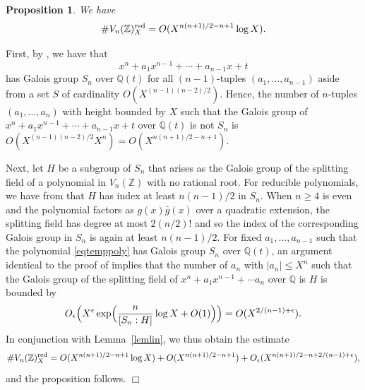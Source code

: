 \documentclass[11pt]{article}
\def\Z{{\mathbb Z}}
\def\red{{\rm red}}
\def\Q{{\mathbb Q}}
\def\V{{\mathcal V}}
\def\Vmn{{V_n}}
\def\Z{{\mathbb Z}}
\def\Q{{\mathbb Q}}
\newtheorem{proposition}[theorem]{Proposition}
\newenvironment{proof}{\noindent {\bf Proof:}}{$\Box$ \vspace{2 ex}}
\begin{document}
\begin{proposition}\label{propredboundall}
We have
  \begin{equation*}
\#\Vmn(\Z)^\red_X=O(X^{n(n+1)/2-n+1}\log X).
  \end{equation*}
\end{proposition}
\begin{proof}
  First, by \cite[Lemma~2]{Dietmann}, we have that
\begin{equation}\label{eqtemppoly}
  x^n+a_1x^{n-1}+\cdots +a_{n-1}x+t
\end{equation}
has Galois group $S_n$ over $\Q(t)$ for all $(n-1)$-tuples
$(a_1,\ldots,a_{n-1})$ aside from a set $S$ of cardinality
$O(X^{(n-1)(n-2)/2})$. Hence, the number of $n$-tuples
$(a_1,\ldots,a_n)$ with height bounded by $X$ such that the Galois
group of $x^n+a_1x^{n-1}+\cdots +a_{n-1}x+t$ over $\Q(t)$ is not $S_n$
is $O(X^{(n-1)(n-2)/2}X^n) = O(X^{n(n+1)/2-n+1})$.

Next, let $H$ be a subgroup of $S_n$ that arises as the Galois group
of the splitting field of a polynomial in $\Vmn(\Z)$ with no rational
root. For reducible polynomials, we have from \cite[Lemma~4]{Dietmann} that
$H$ has index at least $n(n-1)/2$ in $S_n$. When $n\geq4$ is even and
the polynomial factors as $g(x)\bar{g}(x)$ over a quadratic extension,
the splitting field has degree at most $2(n/2)!$ and so the index of
the corresponding Galois group in $S_n$ is again at least $n(n-1)/2$.
For fixed $a_1,\ldots,a_{n-1}$ such that the polynomial
\eqref{eqtemppoly} has Galois group $S_n$ over $\Q(t)$, an argument
identical to the proof of \cite[Theorem~1]{Dietmann} implies that the
number of $a_n$ with $|a_n|\leq X^n$ such that the Galois group of the
splitting field of $x^n+a_1x^{n-1}+\cdots a_n$ over $\Q$ is $H$ is
bounded by
$$
O_\epsilon\Bigl(X^\epsilon\exp\Bigl(\frac{n}{[S_n:H]}\log X +O(1)\Bigr)\Bigr)
=O(X^{2/(n-1)+\epsilon}).
$$
In conjunction with Lemma~\ref{lemlin}, we thus obtain the estimate
  \begin{equation*}
    \#\Vmn(\Z)^\red_X=O(X^{n(n+1)/2-n+1}\log X)+O(X^{n(n+1)/2-n+1})+
    O_\epsilon(X^{n(n+1)/2-n+2/(n-1)+\epsilon}),
  \end{equation*}
and the proposition follows.
\end{proof}



\end{document}
